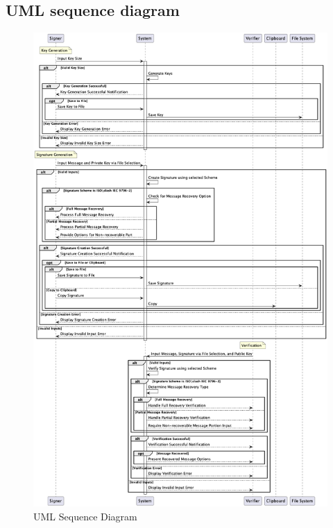 \documentclass[]{final_report}
\theoremstyle{definition}
\begin{document}
\subsection{UML sequence diagram}
\begin{figure}[H]
    \centering
    \includegraphics[scale=0.38]{seq2.png}
    \caption{UML Sequence Diagram}
    \label{fig:uc}
\end{figure}
\end{document}
